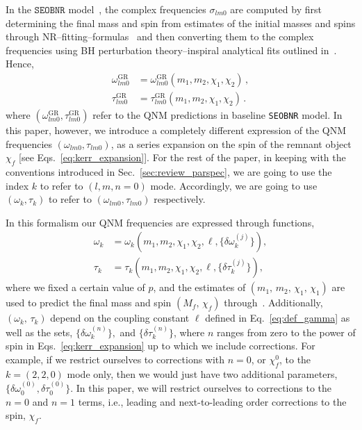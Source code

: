 \documentclass[twocolumn,
               prd,
               aps,
               superscriptaddress,
               tightenlines,
               nofootinbib,
               eqsecnum,
               amsfonts,
               amsmath,
               longbibliography]{revtex4-1}
\newcommand{\SEOB}{\texttt{SEOBNR}}
\begin{document}
In the $\SEOB$ model~\cite{Mihaylov:2021bpf}, the complex frequencies $\sigma_{l m 0}$ are computed by first determining the final mass and spin from estimates of the initial masses and spins through NR--fitting--formulas~\cite{Taracchini:2013rva,Hofmann:2016yih} and then converting them to the complex frequencies using BH perturbation theory--inspiral analytical fits outlined in~\cite{Berti:2005ys,Berti:2009kk}. Hence,
%
\begin{subequations}
\begin{align}
\omega_{l m 0}^{\text{GR}} &= \omega_{l m 0}^{\text{GR}}(m_1, m_2, \chi_1, \chi_2)\,,\\
\tau _{l m 0}^{\text{GR}} &= \tau _{l m 0}^{\text{GR}}(m_1, m_2, \chi_1, \chi_2)\,.
\end{align}
\end{subequations}
%
where $(\omega_{l m 0}^{\text{GR}}, \tau_{l m 0}^{\text{GR}} )$ refer to the
QNM predictions in baseline \SEOB{} model.
%
In this paper, however, we introduce a completely different expression of the
QNM frequencies $(\omega_{l m 0}, \tau_{l m 0})$, as a series expansion on the
spin of the remnant object $\chi_f$ [see Eqs.~\eqref{eq:kerr_expansion}].
%
For the rest of the paper, in keeping with the conventions introduced in
Sec.~\ref{sec:review_parspec}, we are going to use the index $k$ to refer to
$(l, m,n=0)$ mode. Accordingly, we are going to use $(\omega_k, \tau _k)$ to
refer to $(\omega_{l m 0}, \tau _{l m 0})$ respectively.

In this formalism our QNM frequencies are expressed through functions,
%
\begin{subequations}
\begin{align}
\omega_k &= \omega_k(m_1, m_2, \chi_1, \chi_2,\ell, \{\delta \omega_k^{(j)}\}),\\
\tau_k   &= \tau _k(m_1, m_2, \chi_1, \chi_2, \ell, \{\delta \tau_k^{(j)}\}),
\end{align}
\end{subequations}
%
where we fixed a certain value of $p$, and the estimates of $(m_1,\, m_2,\, \chi_1,\, \chi_1)$ are used to predict
the final mass and spin $(M_f,\, \chi_f)$ through~\cite{Taracchini:2013rva,Hofmann:2016yih}.
%
%
Additionally, $(\omega_k,\, \tau_k)$ depend on the coupling constant $\ell$
defined in Eq.~\eqref{eq:def_gamma} as well as the sets, $\{\delta
\omega_k^{(n)}\},$ and $\{\delta \tau_k^{(n)}\}$, where $n$ ranges from zero to
the power of spin in Eqs.~\eqref{eq:kerr_expansion} up to which we include
corrections.
%
For example, if we restrict ourselves to corrections with $n=0$, or
$\chi_f^0$, to the $k=(2,2,0)$ mode only, then we would just have two
additional parameters, $\{\delta \omega_0^{(0)}, \delta \tau_0^{(0)}\}$.
%
In this paper, we will restrict ourselves to corrections to the $n=0$ and
$n=1$ terms, i.e., leading and next-to-leading order corrections to the spin,
$\chi_f$.
\end{document}
